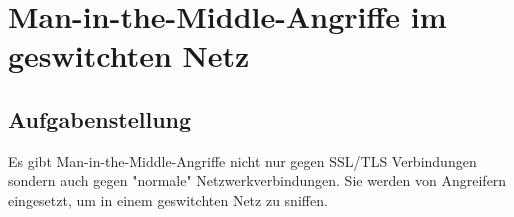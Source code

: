 \section{Man-in-the-Middle-Angriffe im geswitchten Netz}
\subsection*{Aufgabenstellung}
\label{sec:geswitchtes_netz}
Es gibt Man-in-the-Middle-Angriffe nicht nur gegen SSL/TLS
Verbindungen sondern auch gegen "normale" Netzwerkverbindungen.
Sie werden von Angreifern eingesetzt, um in einem geswitchten Netz
zu sniffen.